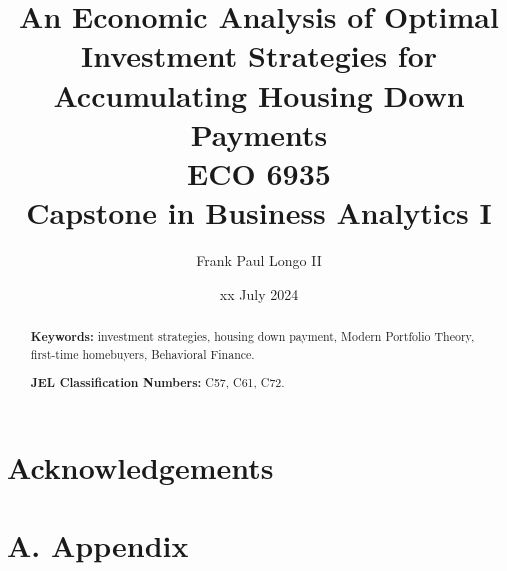 \documentclass[10pt]{article}
\title{An Economic Analysis of Optimal Investment Strategies for Accumulating Housing Down Payments\\
       {\large ECO 6935}\\
       {\large Capstone in Business Analytics I}}
\author{Frank Paul Longo II}
\date{xx July 2024}
\begin{document}
\maketitle

\begin{abstract}


\bigskip
\bigskip

\noindent
\textbf{Keywords:} investment strategies, housing down payment, Modern Portfolio Theory, first-time homebuyers, Behavioral Finance.

\bigskip

\noindent
\textbf{JEL Classification Numbers:} C57, C61, C72.
\end{abstract}

\vfill
\eject







\section*{Acknowledgements}



\section*{A. Appendix}






\end{document}
